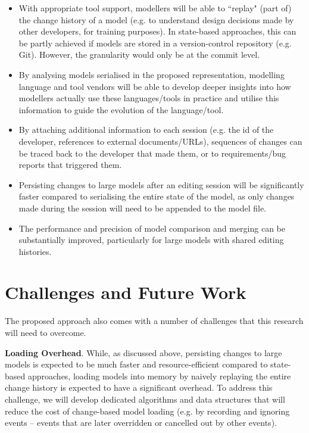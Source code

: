 \documentclass{llncs}
\begin{document}
\begin{itemize}
\item With appropriate tool support, modellers will be able to ``replay" (part of) the change history of a model (e.g. to understand design decisions made by other developers, for training purposes). In state-based approaches, this can be partly achieved if models are stored in a version-control repository (e.g. Git). However, the granularity would only be at the commit level.
\item By analysing models serialised in the proposed representation, modelling language and tool vendors will be able to develop deeper insights into how modellers actually use these languages/tools in practice and utilise this information to guide the evolution of the language/tool.
\item By attaching additional information to each session (e.g. the id of the developer, references to external documents/URLs), sequences of changes can be traced back to the developer that made them, or to requirements/bug reports that triggered them.
\item Persisting changes to large models after an editing session will be significantly faster compared to serialising the entire state of the model, as only changes made during the session will need to be appended to the model file.
\item The performance and precision of model comparison and merging can be substantially improved, particularly for large models with shared editing histories.
\end{itemize}

\section{Challenges and Future Work}
\label{sec:challenges_and_future_works}
The proposed approach also comes with a number of challenges that this research will need to overcome.

\textbf{Loading Overhead}. While, as discussed above, persisting changes to large models is expected to be much faster and resource-efficient compared to state-based approaches, loading models into memory by naively replaying the entire change history is expected to have a significant overhead. To address this challenge, we will develop dedicated algorithms and data structures that will reduce the cost of change-based model loading (e.g. by recording and ignoring events -- events that are later overridden or cancelled out by other events). 
\end{document}
